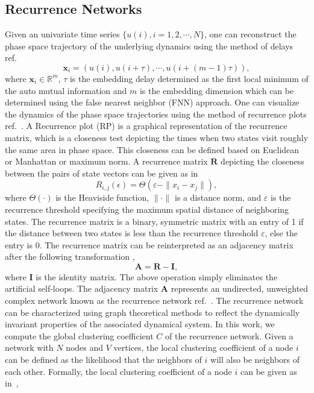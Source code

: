 \documentclass[letterpaper, 9pt, conference]{ieeeconf}
\begin{document}
\subsection{Recurrence Networks}
Given an univariate time series $\{u(i) , i = 1,2, \cdots ,N \}$, one can reconstruct the phase space trajectory of the underlying dynamics using the method of delays ref.~\cite{takens1981detecting}
\begin{equation}
\mathbf{x}_{i} = (u(i),u(i+\tau),\cdots,u(i+(m-1)\tau)),
\end{equation}
where $\mathbf{x}_{i} \in \mathbb{R}^m$, $\tau$ is the embedding delay determined as the first local minimum of the auto mutual information and $m$ is the embedding dimension which can be determined using the false nearest neighbor (FNN) approach. One can visualize the dynamics of the phase space trajectories using the method of recurrence plots ref.~\cite{eckmann1987recurrence}. A Recurrence plot (RP) is a graphical representation of the recurrence matrix, which is a closeness test depicting the times when two states visit roughly the same area in phase space. This closeness can be defined based on Euclidean or Manhattan or maximum norm. A recurrence matrix $\mathbf{R}$ depicting the closeness between the pairs of state vectors can be given as in~\cite{marwan2009complex,donner2010recurrence}
\begin{equation}
R_{i,j}(\epsilon)=\Theta(\varepsilon - \| x_{i}-x_{j}\|),
\end{equation}
where $\Theta(\cdot)$ is the Heaviside function, $\|\cdot\|$ is a distance norm, and $\varepsilon $ is the recurrence threshold specifying the maximum spatial distance of neighboring states. The recurrence matrix is a binary, symmetric matrix with an entry of 1 if the distance between two states is less than the recurrence threshold $\varepsilon$, else the entry is 0. The recurrence matrix can be reinterpreted as an adjacency matrix after the following transformation \cite{marwan2009complex,donner2010recurrence},
\begin{equation}
\mathbf{A} = \mathbf{R}-\mathbf{I},
\end{equation}
where $\mathbf{I}$ is the identity matrix. The above operation simply eliminates the artificial self-loops. The adjacency matrix $\mathbf{A}$ represents an undirected, unweighted complex network known as the recurrence network ref.~\cite{donner2010recurrence}. 
The recurrence network can be characterized using graph theoretical methods to reflect the dynamically invariant properties of the associated dynamical system. In this work, we compute the global clustering coefficient $C$ of the recurrence network. Given a network with $N$ nodes and $V$ vertices, the local clustering coefficient of a node $i$ can be defined as the likelihood that the neighbors of $i$ will also be neighbors of each other. Formally, the local clustering coefficient of a node $i$ can be given as in~\cite{watts1998collective},
\end{document}
